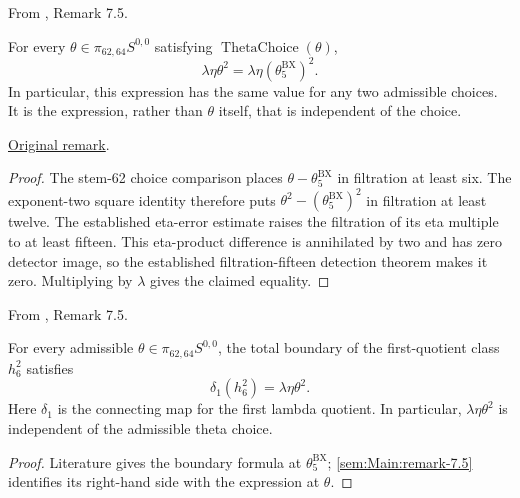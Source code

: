 \begin{remark}
\label{sem:Main:remark-7.5}
From \cite{LWX126}, Remark 7.5.\par
For every $\theta\in\pi_{62,64}S^{0,0}$ satisfying $\operatorname{ThetaChoice}(\theta)$,
\[
 \lambda\eta\theta^2=\lambda\eta(\theta_5^{\mathrm{BX}})^2.
\]
In particular, this expression has the same value for any two admissible choices. It is the expression, rather than $\theta$ itself, that is independent of the choice.

\href{paper/main.tex.html#L2133}{Original remark}.
\end{remark}
\begin{proof}
The stem-62 choice comparison places $\theta-\theta_5^{\mathrm{BX}}$ in filtration at least six. The exponent-two square identity therefore puts $\theta^2-(\theta_5^{\mathrm{BX}})^2$ in filtration at least twelve. The established eta-error estimate raises the filtration of its eta multiple to at least fifteen. This eta-product difference is annihilated by two and has zero detector image, so the established filtration-fifteen detection theorem makes it zero. Multiplying by $\lambda$ gives the claimed equality.
\end{proof}

\begin{theorem}
\label{sem:Main:boundary-formula}
From \cite{LWX126}, Remark 7.5.\par
For every admissible $\theta\in\pi_{62,64}S^{0,0}$, the total boundary of the first-quotient class $h_6^2$ satisfies
\[
 \delta_1(h_6^2)=\lambda\eta\theta^2.
\]
Here $\delta_1$ is the connecting map for the first lambda quotient. In particular, $\lambda\eta\theta^2$ is independent of the admissible theta choice.
\end{theorem}
\begin{proof}
Literature gives the boundary formula at $\theta_5^{\mathrm{BX}}$; \ref{sem:Main:remark-7.5} identifies its right-hand side with the expression at $\theta$.
\end{proof}

